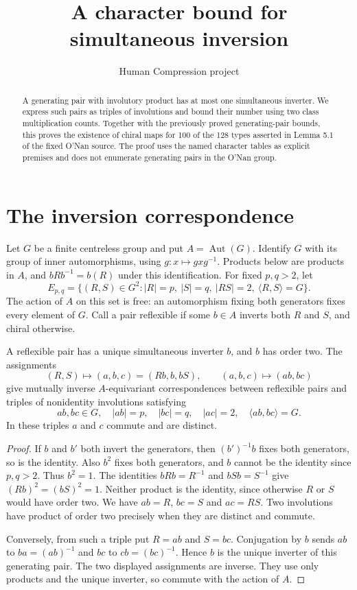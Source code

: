 \documentclass[11pt,a4paper]{article}
\title{A character bound for simultaneous inversion}
\author{Human Compression project}\date{}
\newcommand{\Aut}{\operatorname{Aut}}\newcommand{\Irr}{\operatorname{Irr}}
\begin{document}
\maketitle
\begin{abstract}
A generating pair with involutory product has at most one simultaneous
inverter. We express such pairs as triples of involutions and bound their
number using two class multiplication counts. Together with the previously
proved generating-pair bounds, this proves the existence of chiral maps
for 100 of the 128 types asserted in Lemma 5.1 of the fixed O'Nan source.
The proof uses the named character tables as explicit premises and does
not enumerate generating pairs in the O'Nan group.
\end{abstract}

\section{The inversion correspondence}
Let $G$ be a finite centreless group and put $A=\Aut(G)$. Identify $G$
with its group of inner automorphisms, using $g:x\mapsto gxg^{-1}$.
Products below are products in $A$, and $bRb^{-1}=b(R)$ under this
identification. For fixed $p,q>2$, let
\[
 E_{p,q}=\{(R,S)\in G^2: |R|=p,\ |S|=q,\ |RS|=2,
                    \ \langle R,S\rangle=G\}.
\]
The action of $A$ on this set is free: an automorphism fixing both
generators fixes every element of $G$. Call a pair reflexible if some
$b\in A$ inverts both $R$ and $S$, and chiral otherwise.

\begin{lemma}\label{triple}
A reflexible pair has a unique simultaneous inverter $b$, and $b$ has
order two. The assignments
\[
 (R,S)\longmapsto (a,b,c)=(Rb,b,bS),\qquad
 (a,b,c)\longmapsto (ab,bc)
\]
give mutually inverse $A$-equivariant correspondences between reflexible
pairs and triples of nonidentity involutions satisfying
\[
 ab,bc\in G,\quad |ab|=p,\quad |bc|=q,\quad |ac|=2,
                    \quad\langle ab,bc\rangle=G.
\]
In these triples $a$ and $c$ commute and are distinct.
\end{lemma}
\begin{proof}
If $b$ and $b'$ both invert the generators, then $(b')^{-1}b$ fixes
both generators, so is the identity. Also $b^2$ fixes both generators,
and $b$ cannot be the identity since $p,q>2$. Thus $b^2=1$.
The identities $bRb=R^{-1}$ and $bSb=S^{-1}$ give
$(Rb)^2=(bS)^2=1$. Neither product is the identity, since otherwise
$R$ or $S$ would have order two. We have $ab=R$, $bc=S$ and
$ac=RS$. Two involutions have product of order two precisely when they
are distinct and commute.

Conversely, from such a triple put $R=ab$ and $S=bc$.
Conjugation by $b$ sends $ab$ to $ba=(ab)^{-1}$ and $bc$ to
$cb=(bc)^{-1}$. Hence $b$ is the unique inverter of this generating
pair. The two displayed assignments are inverse. They use only products
and the unique inverter, so commute with the action of $A$.
\end{proof}
\end{document}

